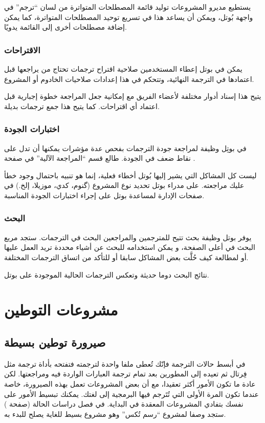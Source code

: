 يستطيع مديرو المشروعات توليد قائمة المصطلحات المتواترة من لسان “ترجم” في
واجهة بُوتل، ويمكن أن يساعد هذا في تسريع توحيد المصطلحات المتواترة، كما
يمكن إضافة مصطلحات أخرى إلى القائمة يدويًا.


\subsection{الاقتراحات}
يمكن في بوتل إعطاء المستخدمين صلاحية اقتراح ترجمات تحتاج من يراجعها قبل
اعتمادها في الترجمة النهائية، وتتحكم في هذا إعدادات صلاحيات الخادوم أو
المشروع.

يتيح هذا إسناد أدوار مختلفة لأعضاء الفريق مع إمكانية جعل المراجعة خطوة
إجبارية قبل اعتماد أي اقتراحات. كما يتيح هذا جمع ترجمات بديلة.


\subsection{اختبارات الجودة}
في بوتِل وظيفة لمراجعة جودة الترجمات بفحص عدة مؤشرات يمكنها أن تدل على
نقاط ضعف في الجودة. طالع قسم “المراجعة الآلية” في صفحة
\at[ref:36134309].

ليست كل المشاكل التي يشير إليها بُوتل أخطاء فعلية، إنما هو تنبيه باحتمال
وجود خطأ عليك مراجعته. على مدراء بوتل تحديد نوع المشروع (گنوم، كدي،
موزيلا، إلخ.) في صفحات الإدارة لمساعدة بوتل على إجراء اختبارات الجودة
المناسبة.


\subsection{البحث}
يوفر بوتل وظيفة بحث تتيح للمترجمين والمراجعين البحث في الترجمات. ستجد
مربع البحث في أعلى الصفحة، و يمكن استخدامه للبحث عن أشياء محددة تريد
العمل عليها أو لمطالعة كيف حُلَّت بعض المشاكل سابقا أو للتأكد من اتساق
الترجمات المختلفة.

نتائج البحث دوما حديثة وتعكس الترجمات الحالية الموجودة على بوتل.

\chapter{مشروعات التوطين}
\section[ref:38565525]{صيرورة توطين بسيطة}
في أبسط حالات الترجمة فإنّك تُعطى
ملفا واحدة لترجمته فتفتحه بأداة ترجمة مثل فِرتال ثم تعيده إلى المطورين
بعد تمام ترجمة العبارات الواردة فيه ومراجعتها. لكن عادة ما تكون الأمور
أكثر تعقيدا، مع أن بعض المشروعات تعمل بهذه الصيرورة، خاصة عندما تكون
المرة الأولى التي تُتَرجم فيها البرمجية إلى لغتك. يمكنك تبسيط الأمور
على نفسك بتفادي المشروعات المعقدة في البداية. في فصل دراسات الحالة
(صفحة \at[ref:34376426]) ستجد وصفا لمشروع “رسم تُكس” وهو
مشروع بسيط للغاية يصلح للبدء به.


